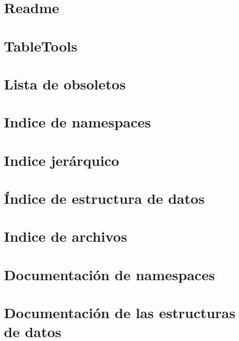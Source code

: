 \let\mypdfximage\pdfximage\def\pdfximage{\immediate\mypdfximage}\documentclass[twoside]{book}
\newcommand{\+}{\discretionary{\mbox{\scriptsize$\hookleftarrow$}}{}{}}
\begin{document}
\chapter{Readme}
\label{md_res_plugins_datatables_extensions__responsive__readme}

\chapter{Table\+Tools}
\label{md_res_plugins_datatables_extensions__table_tools__readme}

\chapter{Lista de obsoletos}
\label{deprecated}

\chapter{Indice de namespaces}

\chapter{Indice jerárquico}

\chapter{Índice de estructura de datos}

\chapter{Indice de archivos}

\chapter{Documentación de namespaces}

\chapter{Documentación de las estructuras de datos}













































\end{document}
